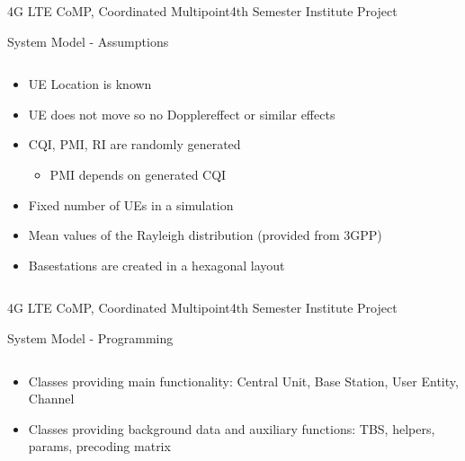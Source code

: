 \documentclass[xcolor={cmyk}]{beamer}
\begin{document}
 \begin{frame}{4G LTE CoMP, Coordinated Multipoint}{4th Semester Institute Project}
	 \begin{block}{System Model - Assumptions}
	 	\begin{columns}
			\begin{column}{.9\textwidth}
				\begin{itemize}
					\item UE Location is known
					\item UE does not move so no Dopplereffect or similar effects
					\item CQI, PMI, RI are randomly generated
					\begin{itemize}
						\item PMI depends on generated CQI
					 \end{itemize}
					\item Fixed number of UEs in a simulation
					\item Mean values of the Rayleigh distribution (provided from 3GPP)
					\item Basestations are created in a hexagonal layout
				\end{itemize}
			\end{column}
		\end{columns}
	 \end{block}
 \end{frame}
 
 \begin{frame}{4G LTE CoMP, Coordinated Multipoint}{4th Semester Institute Project}
	 \begin{block}{System Model - Programming}
	 	\begin{columns}
			\begin{column}{.9\textwidth}
				\begin{itemize}
					\item Classes providing main functionality: Central Unit, Base Station, User Entity, Channel
					\item Classes providing background data and auxiliary functions: TBS, helpers, params, precoding matrix
				\end{itemize}
			\end{column}
		\end{columns}
	 \end{block}
 \end{frame}
 
\end{document}
